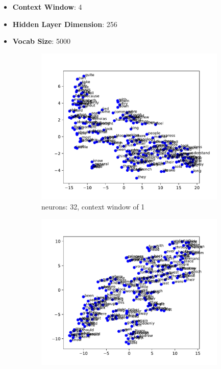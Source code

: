 \documentclass[12pt]{article} \usepackage{COSC420style} \usepackage{soul}
\begin{document}
\begin{itemize}
	\item \textbf{Context Window}: 4
	\item \textbf{Hidden Layer Dimension}: 256
	\item \textbf{Vocab Size}: 5000
\end{itemize}

\begin{figure}[htbp]
	\centering
	\begin{subfigure}[b]{0.45\textwidth}
		\includegraphics[width=\textwidth]{./figures/dim_32_ctx_1_embedding.pdf}
		\caption{neurons: 32, context window of 1}
		\label{fig:32_1}
	\end{subfigure}
	\begin{subfigure}[b]{0.45\textwidth}
		\includegraphics[width=\textwidth]{./figures/dim_32_ctx_4_embedding.pdf}

\end{subfigure}
\end{figure}
\end{document}
